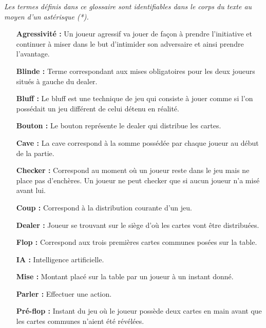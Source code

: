 \documentclass{report}
\begin{document}
	\textit{Les termes définis dans ce glossaire sont identifiables dans le corps du texte au moyen d'un astérisque (*).}
	\bigbreak
	\begin{itemize}
	
		\item[\textbf{Agressivité : }]	Un joueur agressif va jouer de façon à prendre l'initiative et continuer à miser dans le but d'intimider son adversaire et ainsi prendre l'avantage.	\medskip
		
		\item[\textbf{Blinde : }]Terme correspondant aux mises obligatoires pour les deux joueurs situés à gauche du dealer.\medskip
	
		\item[\textbf{Bluff : }]Le bluff est une technique de jeu qui consiste à jouer comme si l'on possédait un jeu différent de celui détenu en réalité.\medskip	
		
		\item[\textbf{Bouton : }]Le bouton représente le dealer qui distribue les cartes.\medskip
		
		\item[\textbf{Cave : }]La cave correspond à la somme possédée par chaque joueur au début de la partie.\medskip		

		\item[\textbf{Checker : }]Correspond au moment où un joueur reste dans le jeu mais ne place pas d'enchères. Un joueur ne peut checker que si aucun joueur n'a misé avant lui.\medskip
		
		\item[\textbf{Coup : }]Correspond à la distribution courante d'un jeu.\medskip		
		
		\item[\textbf{Dealer : }]Joueur se trouvant sur le siège d'où les cartes vont être distribuées.\medskip		
		
		\item[\textbf{Flop : }]Correspond aux trois premières cartes communes posées sur la table.\medskip
		
		\item[\textbf{IA  : }]Intelligence artificielle.
		
		\item[\textbf{Mise : }]Montant placé sur la table par un joueur à un instant donné.\medskip		
		
		\item[\textbf{Parler :}]Effectuer une action.\medskip
		
		\item[\textbf{Pré-flop : }]Instant du jeu où le joueur possède deux cartes en main avant que les cartes communes n'aient été révélées.\medskip	
		

\end{itemize}
\end{document}
